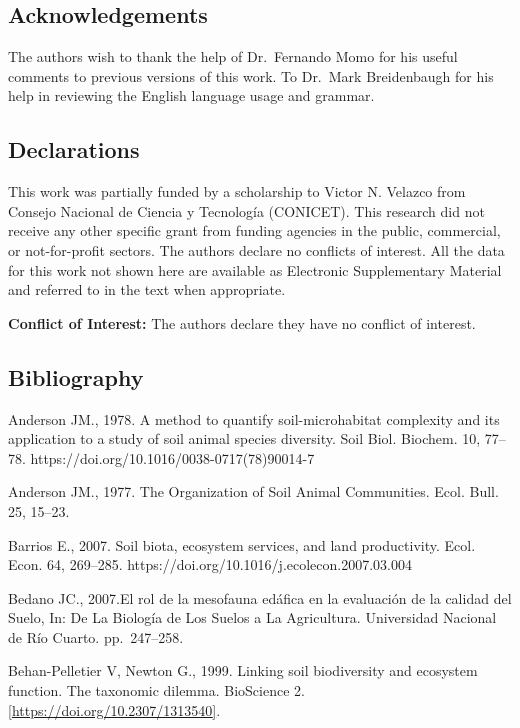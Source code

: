 \documentclass[11pt]{article}
\begin{document}
\hypertarget{acknowledgements}{%
\subsection{Acknowledgements}\label{acknowledgements}}

The authors wish to thank the help of Dr.~Fernando Momo for his useful
comments to previous versions of this work. To Dr.~Mark Breidenbaugh for
his help in reviewing the English language usage and grammar.

\hypertarget{declarations}{%
\subsection{Declarations}\label{declarations}}

This work was partially funded by a scholarship to Victor N. Velazco
from Consejo Nacional de Ciencia y Tecnología (CONICET). This research
did not receive any other specific grant from funding agencies in the
public, commercial, or not-for-profit sectors. The authors declare no
conflicts of interest. All the data for this work not shown here are
available as Electronic Supplementary Material and referred to in the
text when appropriate.

\textbf{Conflict of Interest:} The authors declare they have no conflict
of interest.

\hypertarget{bibliography}{%
\subsection{Bibliography}\label{bibliography}}

Anderson JM., 1978. A method to quantify soil-microhabitat complexity
and its application to a study of soil animal species diversity. Soil
Biol. Biochem. 10, 77--78. https://doi.org/10.1016/0038-0717(78)90014-7

Anderson JM., 1977. The Organization of Soil Animal Communities. Ecol.
Bull. 25, 15--23.

Barrios E., 2007. Soil biota, ecosystem services, and land productivity.
Ecol. Econ. 64, 269--285. https://doi.org/10.1016/j.ecolecon.2007.03.004

Bedano JC., 2007.El rol de la mesofauna edáfica en la evaluación de la
calidad del Suelo, In: De La Biología de Los Suelos a La Agricultura.
Universidad Nacional de Río Cuarto. pp.~247--258.

Behan-Pelletier V, Newton G., 1999. Linking soil biodiversity and
ecosystem function. The taxonomic dilemma. BioScience 2.
\href{https://doi.org/10.2307/1313540}{{[}https://doi.org/10.2307/1313540{]}}.
\end{document}
